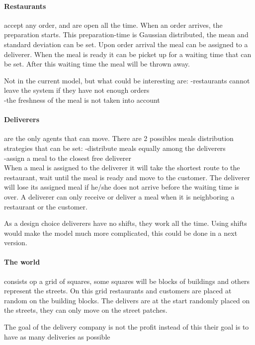 \paragraph{Restaurants} accept any order, and are open all the time.
When an order arrives, the preparation starts.
This preparation-time is Gaussian distributed, the mean and standard deviation can be set.
Upon order arrival the meal can be assigned to a deliverer.
When the meal is ready it can be picket up for a waiting time that can be set.
After this waiting time the meal will be thrown away.

Not in the current model, but what could be interesting are:
-restaurants cannot leave the system if they have not enough orders\\
-the freshness of the meal is not taken into account\\

\paragraph{Deliverers} are the only agents that can move.
There are 2 possibles meals distribution strategies that can be set:
-distribute meals equally among the deliverers\\
-assign a meal to the closest free deliverer\\

When a meal is assigned to the deliverer it will take the shortest route
to the restaurant, wait until the meal is ready and move to the customer.
The deliverer will lose its assigned meal if he/she does not arrive before the waiting time is over.
A deliverer can only receive or deliver a meal when it is neighboring a restaurant or the customer.

As a design choice deliverers have no shifts, they work all the time.
Using shifts would make the model much more complicated, this could be done in a next version.

\paragraph{The world} consists op a grid of squares, some squares will be blocks of buildings and others represent the streets.
On this grid restaurants and customers are placed at random on the building blocks.
The delivers are at the start randomly placed on the streets, they can only move on the street patches.

The goal of the delivery company is not the profit instead of this their goal is to have as many deliveries as possible

